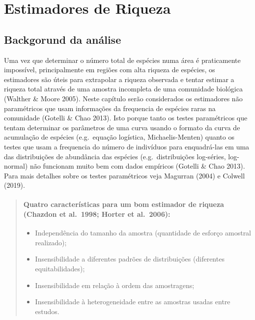 \documentclass[
]{book}
\providecommand{\tightlist}{%
  \setlength{\itemsep}{0pt}\setlength{\parskip}{0pt}}
\begin{document}
\hypertarget{estimadores-de-riqueza}{%
\chapter{Estimadores de Riqueza}\label{estimadores-de-riqueza}}

\hypertarget{backgorund-da-anuxe1lise}{%
\section{Backgorund da análise}\label{backgorund-da-anuxe1lise}}

Uma vez que determinar o número total de espécies numa área é praticamente impossível, principalmente em regiões com alta riqueza de espécies, os estimadores são úteis para extrapolar a riqueza observada e tentar estimar a riqueza total através de uma amostra incompleta de uma comunidade biológica (Walther \& Moore 2005). Neste capítulo serão considerados os estimadores não paramétricos que usam informações da frequencia de espécies raras na comunidade (Gotelli \& Chao 2013). Isto porque tanto os testes paramétricos que tentam determinar os parâmetros de uma curva usando o formato da curva de acumulação de espécies (e.g.~equação logística, Michaelis-Menten) quanto os testes que usam a frequencia do número de indivíduos para enquadrá-las em uma das distribuições de abundância das espécies (e.g.~distribuições log-séries, log-normal) não funcionam muito bem com dados empíricos (Gotelli \& Chao 2013). Para mais detalhes sobre os testes paramétricos veja Magurran (2004) e Colwell (2019).

\begin{quote}
\hypertarget{quatro-caracteruxedsticas-para-um-bom-estimador-de-riqueza-chazdon-et-al.-1998-horter-et-al.-2006}{%
\subsubsection{Quatro características para um bom estimador de riqueza (Chazdon et al.~1998; Horter et al.~2006):}\label{quatro-caracteruxedsticas-para-um-bom-estimador-de-riqueza-chazdon-et-al.-1998-horter-et-al.-2006}}

\begin{itemize}
\tightlist
\item
  Independência do tamanho da amostra (quantidade de esforço amostral realizado);
\item
  Insensibilidade a diferentes padrões de distribuições (diferentes equitabilidades);
\item
  Insensibilidade em relação à ordem das amostragens;
\item
  Insensibilidade à heterogeneidade entre as amostras usadas entre estudos.
\end{itemize}
\end{quote}
\end{document}
